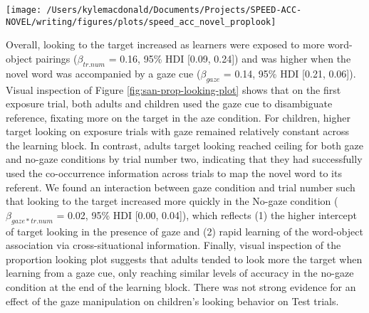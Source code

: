 \documentclass[10pt, letterpaper]{article}
\newenvironment{CodeChunk}{}{}
\begin{document}
\begin{CodeChunk}
\begin{figure*}[t]

{\centering \texttt{[image: /Users/kylemacdonald/Documents/Projects/SPEED-ACC-NOVEL/writing/figures/plots/speed\_acc\_novel\_proplook]} 

}

\caption[Panel A shows participants’ tendency to look at the speaker on exposure and test trials as a function of the trial number within a learning block]{Panel A shows participants’ tendency to look at the speaker on exposure and test trials as a function of the trial number within a learning block. The horizontal, dashed line represents the tendency to distribute attention equally across the three AOIs. Color indicates gaze condition and error bars represent 95\% credible intervals. Panel B shows the same information but for target and distracter looking across the learning block (left) and aggregated over all trials (right).}\label{fig:san-prop-looking-plot}
\end{figure*}
\end{CodeChunk}

Overall, looking to the target increased as learners were exposed to
more word-object pairings (\(\beta_{tr.num}\) = 0.16, 95\% HDI {[}0.09,
0.24{]}) and was higher when the novel word was accompanied by a gaze
cue (\(\beta_{gaze}\) = 0.14, 95\% HDI {[}0.21, 0.06{]}). Visual
inspection of Figure \ref{fig:san-prop-looking-plot} shows that on the
first exposure trial, both adults and children used the gaze cue to
disambiguate reference, fixating more on the target in the aze
condition. For children, higher target looking on exposure trials with
gaze remained relatively constant across the learning block. In
contrast, adults target looking reached ceiling for both gaze and
no-gaze conditions by trial number two, indicating that they had
successfully used the co-occurrence information across trials to map the
novel word to its referent. We found an interaction between gaze
condition and trial number such that looking to the target increased
more quickly in the No-gaze condition (\(\beta_{gaze*tr.num}\) = 0.02,
95\% HDI {[}0.00, 0.04{]}), which reflects (1) the higher intercept of
target looking in the presence of gaze and (2) rapid learning of the
word-object association via cross-situational information. Finally,
visual inspection of the proportion looking plot suggests that adults
tended to look more the target when learning from a gaze cue, only
reaching similar levels of accuracy in the no-gaze condition at the end
of the learning block. There was not strong evidence for an effect of
the gaze manipulation on children's looking behavior on Test trials.
\end{document}

